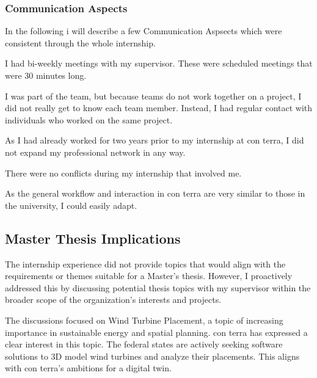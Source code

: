 \documentclass[11pt, titlepage, a4paper]{article}
\begin{document}
 \subsubsection{Communication Aspects}
In the following i will describe a few Communication Aspsects which were consistent through the whole internship.
 \begin{description}[]
     \item[Supervisor Communication:] I had bi-weekly meetings with my supervisor. These were scheduled meetings that were 30 minutes long.
     \item[Teamwork:] I was part of the team, but because teams do not work together on a project, I did not really get to know each team member. Instead, I had regular contact with individuals who worked on the same project. 
     \item[Professional Network:] As I had already worked for two years prior to my internship at con terra, I did not expand my professional network in any way.
     \item[Conflicts:] There were no conflicts during my internship that involved me.
      \item[Applied Communication Skills:]  As the general workflow and interaction in con terra are very similar to those in the university, I could easily adapt.
\end{description}

\subsection{Master Thesis Implications}
The internship experience did not provide topics that would align with the requirements or themes suitable for a Master's thesis. However, I proactively addressed this by discussing potential thesis topics with my supervisor within the broader scope of the organization's interests and projects.

The discussions focused on Wind Turbine Placement, a topic of increasing importance in sustainable energy and spatial planning. con terra has expressed a clear interest in this topic. The federal states are actively seeking software solutions to 3D model wind turbines and analyze their placements. This aligns with con terra's ambitions for a digital twin.
\end{document}
